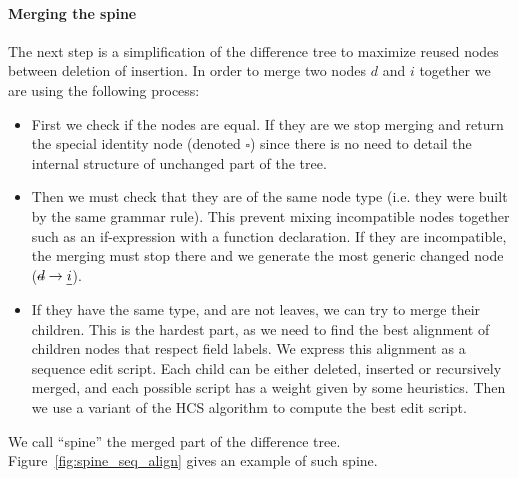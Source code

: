\documentclass[a4paper,11pt]{article}
\newcommand\del[1]{\text{\st{$#1$}}}
\newcommand\ins[1]{\text{\ul{$#1$}}}
\newcommand\id{\square}
\newcommand\change[2]{\del{#1} \rightarrow \ins{#2}}
\begin{document}
\paragraph{Merging the spine}
The next step is a simplification of the difference tree to maximize reused
nodes between deletion of insertion.
In order to merge two nodes $d$ and $i$ together we are using the following
process:
\begin{itemize}
 \item First we check if the nodes are equal. If they are we stop merging and
return the special identity node (denoted $\id$) since there is no need to
detail the internal structure of unchanged part of the tree.
 \item Then we must check that they are of the same node type (i.e. they were
built by the same grammar rule). This prevent
mixing incompatible nodes together such as an if-expression with a function
declaration. If they are incompatible, the merging must stop there and we
generate the most generic changed node ($\change{d}{i}$).
 \item If they have the same type, and are not leaves, we can try to merge
their children. This is the hardest part, as we need to find the best alignment
of children nodes that respect field labels. We express this alignment as a
sequence edit script. Each child can be either deleted, inserted or recursively
merged, and each possible script has a weight given by some heuristics. Then we
use a variant of the HCS algorithm to compute the best edit script.
\end{itemize}

We call ``spine'' the merged part of the difference tree.
Figure~\ref{fig:spine_seq_align} gives an example of such spine.
\end{document}
